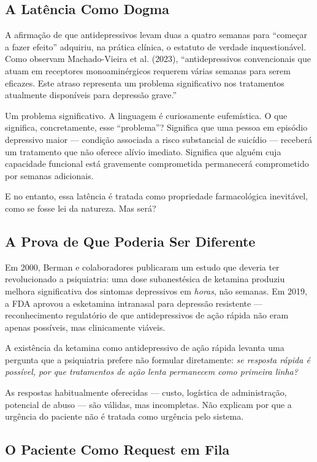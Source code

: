 \subsection{A Latência Como Dogma}

A afirmação de que antidepressivos levam duas a quatro semanas para \enquote{começar a fazer efeito} adquiriu, na prática clínica, o estatuto de verdade inquestionável. Como observam Machado-Vieira et al. (2023), \enquote{antidepressivos convencionais que atuam em receptores monoaminérgicos requerem várias semanas para serem eficazes. Este atraso representa um problema significativo nos tratamentos atualmente disponíveis para depressão grave.}

Um problema significativo. A linguagem é curiosamente eufemística. O que significa, concretamente, esse \enquote{problema}? Significa que uma pessoa em episódio depressivo maior --- condição associada a risco substancial de suicídio --- receberá um tratamento que não oferece alívio imediato. Significa que alguém cuja capacidade funcional está gravemente comprometida permanecerá comprometido por semanas adicionais.

E no entanto, essa latência é tratada como propriedade farmacológica inevitável, como se fosse lei da natureza. Mas será?

\subsection{A Prova de Que Poderia Ser Diferente}

Em 2000, Berman e colaboradores publicaram um estudo que deveria ter revolucionado a psiquiatria: uma dose subanestésica de ketamina produziu melhora significativa dos sintomas depressivos em \textit{horas}, não semanas. Em 2019, a FDA aprovou a esketamina intranasal para depressão resistente --- reconhecimento regulatório de que antidepressivos de ação rápida não eram apenas possíveis, mas clinicamente viáveis.

A existência da ketamina como antidepressivo de ação rápida levanta uma pergunta que a psiquiatria prefere não formular diretamente: \textit{se resposta rápida é possível, por que tratamentos de ação lenta permanecem como primeira linha?}

As respostas habitualmente oferecidas --- custo, logística de administração, potencial de abuso --- são válidas, mas incompletas. Não explicam por que a urgência do paciente não é tratada como urgência pelo sistema.

\subsection{O Paciente Como Request em Fila}


